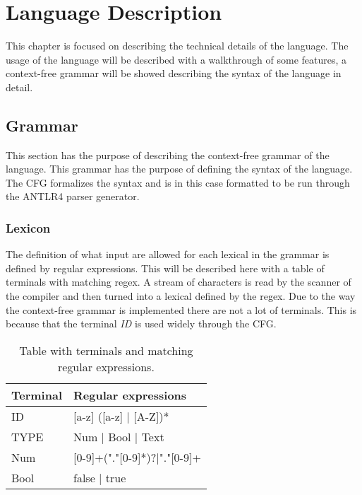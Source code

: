 \chapter{Language Description}
\label{chap:LanguageDescription}
This chapter is focused on describing the technical details of the language. The usage of the language will be described with a walkthrough of some features, a context-free grammar will be showed describing the syntax of the language in detail. 

\section{Grammar}
\label{sec:Grammar}
This section has the purpose of describing the context-free grammar of the language. This grammar has the purpose of defining the syntax of the language. The CFG formalizes the syntax and is in this case formatted to be run through the ANTLR4 parser generator.

\subsection{Lexicon}
The definition of what input are allowed for each lexical in the grammar is defined by regular expressions. This will be described here with a table of terminals with matching regex. A stream of characters is read by the scanner of the compiler and then turned into a lexical defined by the regex.
Due to the way the context-free grammar is implemented there are not a lot of terminals. This is because that the terminal \emph{ID} is used widely through the CFG.  

\begin{table}[]
\centering
\label{fig:Lexicon}
\begin{tabular}{|l|l|}
\hline
Terminal & Regular expressions                \\ \hline
ID       & {[}a-z{]} ({[}a-z{]} | {[}A-Z{]})* \\ \hline
TYPE     & Num | Bool | Text                  \\ \hline
Num		 & [0-9]+("."[0-9]*)?|"."[0-9]+		  \\ \hline
Bool 	 & false | true						  \\ \hline
\end{tabular}
\caption{Table with terminals and matching regular expressions.}
\end{table}
